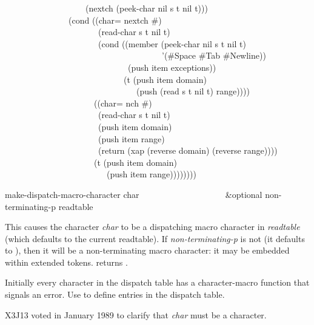 \begin{table}
\begin{new}
\begin{lisp}
~~~~~~~~~~~~~~~~~~~(nextch (peek-char nil s t nil t))) \\
~~~~~~~~~~~~~~~(cond ((char= nextch \#{\Xbackslash}{\Xarrowright}) \\
~~~~~~~~~~~~~~~~~~~~~~(read-char s t nil t) \\
~~~~~~~~~~~~~~~~~~~~~~(cond ((member (peek-char nil s t nil t) \\
~~~~~~~~~~~~~~~~~~~~~~~~~~~~~~~~~~~~~'(\#{\Xbackslash}Space \#{\Xbackslash}Tab \#{\Xbackslash}Newline)) \\
~~~~~~~~~~~~~~~~~~~~~~~~~~~~~(push item exceptions)) \\
~~~~~~~~~~~~~~~~~~~~~~~~~~~~(t (push item domain) \\
~~~~~~~~~~~~~~~~~~~~~~~~~~~~~~~(push (read s t nil t) range)))) \\
~~~~~~~~~~~~~~~~~~~~~((char= nch \#{\Xbackslash}{\Xrbrace}) \\
~~~~~~~~~~~~~~~~~~~~~~(read-char s t nil t) \\
~~~~~~~~~~~~~~~~~~~~~~(push item domain) \\
~~~~~~~~~~~~~~~~~~~~~~(push item range) \\
~~~~~~~~~~~~~~~~~~~~~~(return (xap (reverse domain) (reverse range)))) \\
~~~~~~~~~~~~~~~~~~~~~(t (push item domain) \\
~~~~~~~~~~~~~~~~~~~~~~~~(push item range))))))))
\end{lisp}
\end{new}
\end{table}

\begin{defun}[Function]
make-dispatch-macro-character char ~~~~~~~~~~~~~~~~~~~ &optional non-terminating-p readtable

This causes the character \emph{char} to be a dispatching macro character
in \emph{readtable} (which defaults to the current readtable).
If \emph{non-terminating-p} is not {\false} (it defaults to {\false}),
then it will be a non-terminating macro character: it may be embedded
within extended tokens.
 returns {\true}.

Initially every character in the dispatch table has a character-macro
function that signals an error.  Use 
to define entries in the dispatch table.
\begin{new}
X3J13 voted in January 1989
to clarify that \emph{char} must be a character.
\end{new}

\end{defun}

